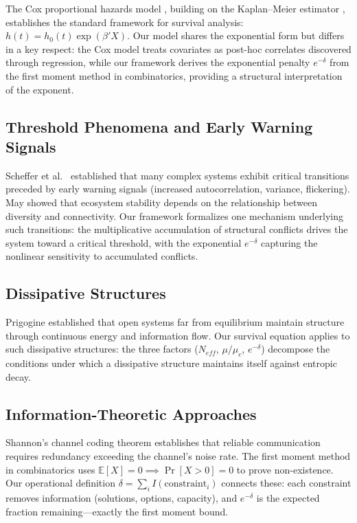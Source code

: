 \documentclass[11pt,a4paper]{article}
\begin{document}
The Cox proportional hazards model \citep{cox1972}, building on the Kaplan--Meier estimator \citep{kaplan1958}, establishes the standard framework for survival analysis: $h(t) = h_0(t) \exp(\beta' X)$. Our model shares the exponential form but differs in a key respect: the Cox model treats covariates as post-hoc correlates discovered through regression, while our framework derives the exponential penalty $e^{-\delta}$ from the first moment method in combinatorics, providing a structural interpretation of the exponent.

\subsection{Threshold Phenomena and Early Warning Signals}

Scheffer et al.\ \citep{scheffer2009} established that many complex systems exhibit critical transitions preceded by early warning signals (increased autocorrelation, variance, flickering). May \citep{may1972} showed that ecosystem stability depends on the relationship between diversity and connectivity. Our framework formalizes one mechanism underlying such transitions: the multiplicative accumulation of structural conflicts drives the system toward a critical threshold, with the exponential $e^{-\delta}$ capturing the nonlinear sensitivity to accumulated conflicts.

\subsection{Dissipative Structures}

Prigogine \citep{prigogine1984} established that open systems far from equilibrium maintain structure through continuous energy and information flow. Our survival equation applies to such dissipative structures: the three factors ($N_{eff}$, $\mu/\mu_c$, $e^{-\delta}$) decompose the conditions under which a dissipative structure maintains itself against entropic decay.

\subsection{Information-Theoretic Approaches}

Shannon's channel coding theorem \citep{shannon1948,cover2006} establishes that reliable communication requires redundancy exceeding the channel's noise rate. The first moment method in combinatorics \citep{alon2016} uses $\mathbb{E}[X] = 0 \implies \Pr[X > 0] = 0$ to prove non-existence. Our operational definition $\delta = \sum_i I(\text{constraint}_i)$ connects these: each constraint removes information (solutions, options, capacity), and $e^{-\delta}$ is the expected fraction remaining---exactly the first moment bound.
\end{document}
